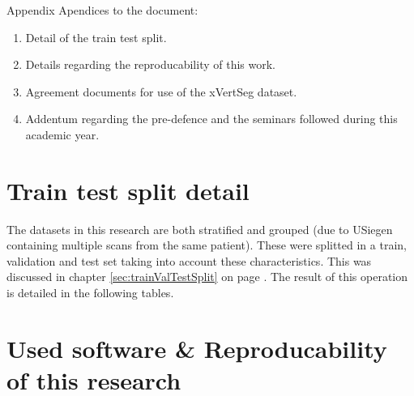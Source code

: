 \appendix

\begin{partwithabstract}{Appendix}
  Apendices to the document:
  \begin{enumerate}
    \item Detail of the train test split.
    \item Details regarding the reproducability of this work.
    \item Agreement documents for use of the xVertSeg dataset.
    \item Addentum regarding the pre-defence and the seminars followed during this academic year.
  \end{enumerate}
\end{partwithabstract}
\restoregeometry

\chapter{Train test split detail\label{sec:appendix_split}}

The datasets in this research are both stratified and grouped (due to USiegen containing multiple scans from the same patient).
These were splitted in a train, validation and test set taking into account these characteristics.
This was discussed in chapter \ref{sec:trainValTestSplit} on page \pageref{sec:trainValTestSplit}.
The result of this operation is detailed in the following tables.




\chapter{Used software \& Reproducability of this research}

